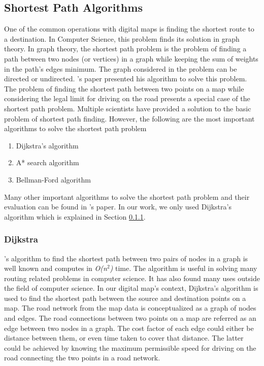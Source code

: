 \subsection{Shortest Path Algorithms}
One of the common operations with digital maps is finding the shortest route to a destination. In Computer Science, this problem finds its solution in graph theory. In graph theory, the shortest path problem is the problem of finding a path between two nodes (or vertices) in a graph while keeping the sum of weights in the path's edges minimum. The graph considered in the problem can be directed or undirected. \citet{floyd1962algorithm}'s paper presented his algorithm to solve this problem. The problem of finding the shortest path between two points on a map while considering the legal limit for driving on the road presents a special case of the shortest path problem. Multiple scientists have provided a solution to the basic problem of shortest path finding. However, the following are the most important algorithms to solve the shortest path problem
\begin{enumerate}
\item Dijkstra's algorithm
\item A* search algorithm
\item Bellman-Ford algorithm
\end{enumerate}    
Many other important algorithms to solve the shortest path problem and their evaluation can be found in \citet{cherkassky1996shortest}'s paper. In our work, we only used Dijkstra's algorithm which is explained in Section \ref{dijkstra}.
\subsubsection{Dijkstra}\label{dijkstra}
\citet{dijkstra1959note}'s algorithm to find the shortest path between two pairs of nodes in a graph is well known and computes in \textit{O(n$^{2}$)} time. The algorithm is useful in solving many routing related problems in computer science. It has also found many uses outside the field of computer science. In our digital map's context, Dijkstra's algorithm is used to find the shortest path between the source and destination points on a map. The road network from the map data is conceptualized as a graph of nodes and edges. The road connections between two points on a map are referred as an edge between two nodes in a graph. The cost factor of each edge could either be distance between them, or even time taken to cover that distance. The latter could be achieved by knowing the maximum permissible speed for driving on the road connecting the two points in a road network.



